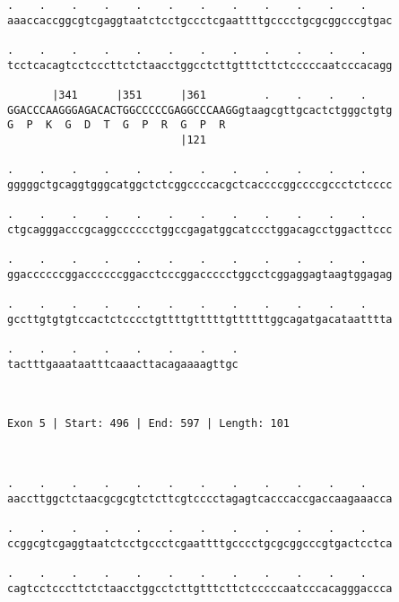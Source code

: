\documentclass{article}
\begin{document}
\begin{Verbatim}
.    .    .    .    .    .    .    .    .    .    .    .    
aaaccaccggcgtcgaggtaatctcctgccctcgaattttgcccctgcgcggcccgtgac
                                                            
.    .    .    .    .    .    .    .    .    .    .    .    
tcctcacagtcctcccttctctaacctggcctcttgtttcttctcccccaatcccacagg
                                                            
       |341      |351      |361         .    .    .    .    
GGACCCAAGGGAGACACTGGCCCCCGAGGCCCAAGGgtaagcgttgcactctgggctgtg
G  P  K  G  D  T  G  P  R  G  P  R                          
                           |121                             
  
.    .    .    .    .    .    .    .    .    .    .    .    
gggggctgcaggtgggcatggctctcggccccacgctcaccccggccccgccctctcccc
                                                            
.    .    .    .    .    .    .    .    .    .    .    .    
ctgcagggacccgcaggcccccctggccgagatggcatccctggacagcctggacttccc
                                                            
.    .    .    .    .    .    .    .    .    .    .    .    
ggaccccccggaccccccggacctcccggaccccctggcctcggaggagtaagtggagag
                                                            
.    .    .    .    .    .    .    .    .    .    .    .    
gccttgtgtgtccactctcccctgttttgtttttgttttttggcagatgacataatttta
                                                            
.    .    .    .    .    .    .    .
tactttgaaataatttcaaacttacagaaaagttgc
                                    
                                    
 
Exon 5 | Start: 496 | End: 597 | Length: 101



.    .    .    .    .    .    .    .    .    .    .    .    
aaccttggctctaacgcgcgtctcttcgtcccctagagtcacccaccgaccaagaaacca
                                                            
.    .    .    .    .    .    .    .    .    .    .    .    
ccggcgtcgaggtaatctcctgccctcgaattttgcccctgcgcggcccgtgactcctca
                                                            
.    .    .    .    .    .    .    .    .    .    .    .    
cagtcctcccttctctaacctggcctcttgtttcttctcccccaatcccacagggaccca
                                                            

\end{Verbatim}
\end{document}
